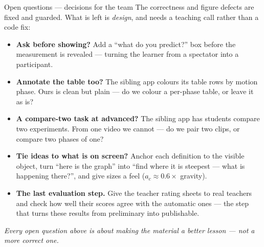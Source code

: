 \documentclass[aspectratio=169,10pt]{beamer}
\newcommand{\takeaway}[1]{\vfill{\footnotesize\itshape\color{cGrey}#1\par}}
\begin{document}
\begin{frame}{Open questions --- decisions for the team}
\small
The correctness and figure defects are fixed and guarded. What is left is \emph{design}, and needs a
teaching call rather than a code fix:
\vspace{0.2em}
\begin{itemize}\setlength\itemsep{2.5pt}
  \item \textbf{\color{cAccent}Ask before showing?} Add a ``what do you predict?'' box before the
  measurement is revealed --- turning the learner from a spectator into a participant.
  \item \textbf{\color{cAccent}Annotate the table too?} The sibling app colours its table rows by
  motion phase. Ours is clean but plain --- do we colour a per-phase table, or leave it as is?
  \item \textbf{\color{cAccent}A compare-two task at advanced?} The sibling app has students compare
  two experiments. From one video we cannot --- do we pair two clips, or compare two phases of one?
  \item \textbf{\color{cAccent}Tie ideas to what is on screen?} Anchor each definition to the visible
  object, turn ``here is the graph'' into ``find where it is steepest --- what is happening there?'',
  and give sizes a feel ($a_c \approx 0.6\times$ gravity).
  \item \textbf{\color{cAccent}The last evaluation step.} Give the teacher rating sheets to real
  teachers and check how well their scores agree with the automatic ones --- the step that turns
  these results from preliminary into publishable.
\end{itemize}
\takeaway{Every open question above is about making the material a better \emph{lesson} --- not a more
correct one.}
\end{frame}
\end{document}
